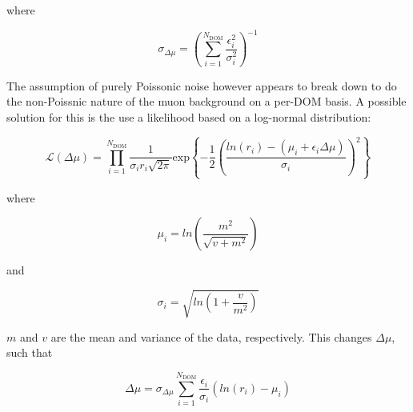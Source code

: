 \noindent where 

\begin{equation}
  \sigma_{\Delta \mu} = \left( \sum_{i = 1}^{N_{\textrm{DOM}}} \frac{\epsilon_{i}^{2}}{\sigma_{i}^{2}} \right)^{-1}
\end{equation}

The assumption of purely Poissonic noise however appears to break down to do the non-Poissnic nature of the muon background on a per-DOM basis. A possible solution for this is the use a likelihood based on a log-normal distribution:

\begin{equation}
    \mathcal{L}(\Delta \mu) = \prod_{i=1}^{N_{\textrm{DOM}}} \frac{1}{\sigma_{i} r_{i} \sqrt{2\pi} } \textrm{exp} \left\{ -\frac{1}{2} \left( \frac{ln(r_{i}) - (\mu_{i} + \epsilon_{i}\Delta \mu)}{\sigma_{i}}  \right)^{2} \right\}
\end{equation}

\noindent where 

\begin{equation}
  \mu_{i} = ln\left( \frac{m^{2}}{\sqrt{ v + m^{2}}}\right)
\end{equation}

\noindent and

\begin{equation}
  \sigma_{i} = \sqrt{ ln(1 + \frac{v}{m^{2}}) }
\end{equation}

\noindent $m$ and $v$ are the mean and variance of the data, respectively. This changes $\Delta \mu$, such that

\begin{equation}
  \Delta \mu = \sigma_{\Delta \mu} \sum_{i = 1}^{N_{\textrm{DOM}}} \frac{\epsilon_{i}}{\sigma_{i}} (ln(r_{i}) - \mu_{i})
\end{equation}

